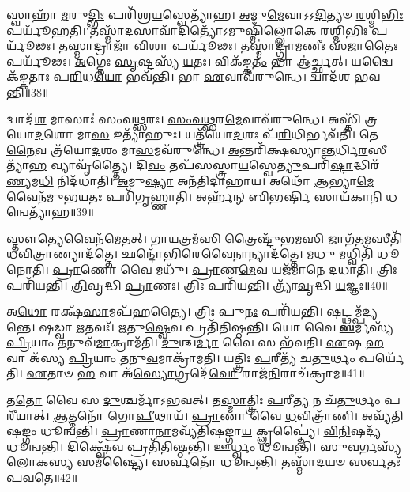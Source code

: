 𑌸𑍍𑌵𑌾𑌹𑌾᳴ \ul{𑌮}\-𑌰𑍁\-\ul{𑌦𑍍𑌭𑌿𑌃} 𑌪𑌰𑌿᳴𑌶𑍍𑌰\-\ul{𑌯}\-𑌸𑍍𑌵𑍇𑌤𑍍𑌯𑌾᳴𑌹। 
\-\ul{𑌅}\-𑌮𑍁\-\ul{𑌮𑍇}\-𑌵𑌾𑌽𑌽\-\ul{𑌦𑌿}\-𑌤𑍍𑌯𑍞 \ul{𑌰}\-𑌶𑍍𑌮𑌿\-\ul{𑌭𑌿𑌃} 𑌪𑌰𑍍𑌯𑍂᳴𑌹𑌤𑌿। 
𑌤𑌸𑍍𑌮𑌾᳴\-\ul{𑌦}\-𑌸𑌾𑌵𑌾᳴\-\ul{𑌦𑌿}\-𑌤𑍍𑌯𑍋᳴𑌽𑌮𑍁𑌷𑍍𑌮𑌿𑌁᳴\-\ul{𑌲𑍍𑌲𑍋}\-𑌕𑍇 \ul{𑌰}\-𑌶𑍍𑌮𑌿\-\ul{𑌭𑌿𑌃} 𑌪𑌰𑍍𑌯𑍂᳴𑌢𑌃। 
𑌤\-\ul{𑌸𑍍𑌮𑌾}\-𑌦𑍍𑌰𑌾𑌜𑌾᳴ \ul{𑌵𑌿}\-𑌶𑌾 𑌪𑌰𑍍𑌯𑍂᳴𑌢𑌃। 
𑌤𑌸𑍍𑌮𑌾॑𑌦𑍍𑌗𑍍𑌰𑌾\-\ul{𑌮}\-𑌣𑍀𑌃 𑌸᳴\-\ul{𑌜𑌾}\-𑌤𑍈𑌃 𑌪𑌰𑍍𑌯𑍂᳴𑌢𑌃। 
\-\ul{𑌅}\-𑌗𑍍𑌨𑍇𑌃 \ul{𑌸𑍃}\-𑌷𑍍𑌟𑌸𑍍𑌯᳴ \ul{𑌯}\-𑌤𑌃। 
𑌵𑌿𑌕᳴𑌙𑍍𑌕\-\ul{𑌤𑌂} 𑌭𑌾 𑌆॑𑌰𑍍𑌚𑍍𑌛𑌤𑍍। 
𑌯𑌦𑍍𑌵𑍈𑌕᳴𑌙𑍍𑌕𑌤𑌾𑌃 𑌪\-\ul{𑌰𑌿}\-𑌧\-\ul{𑌯𑍋} 𑌭𑌵᳴𑌨𑍍𑌤𑌿। 
𑌭𑌾 \ul{𑌏}\-𑌵𑌾𑌵᳴𑌰𑍁𑌨𑍍𑌧𑍇। 
𑌦𑍍𑌵𑌾𑌦᳴𑌶 𑌭𑌵𑌨𑍍𑌤𑌿॥38॥

𑌦𑍍𑌵𑌾𑌦᳴\-\ul{𑌶} 𑌮𑌾𑌸𑌾𑌃॑ 𑌸𑌂𑌵\-\ul{𑌥𑍍𑌸}\-𑌰𑌃। 
\-\ul{𑌸𑌂}\-\-\ul{𑌵}\-\-\ul{𑌥𑍍𑌸}\-𑌰\-\ul{𑌮𑍇}\-𑌵𑌾𑌵᳴𑌰𑍁𑌨𑍍𑌧𑍇। 
𑌅𑌸𑍍𑌤𑌿᳴ 𑌤𑍍𑌰𑌯𑍋\-\ul{𑌦}\-𑌶𑍋 𑌮𑌾\-\ul{𑌸} 𑌇𑌤𑍍𑌯𑌾᳴𑌹𑍁𑌃। 
𑌯𑌤𑍍𑌤𑍍𑌰᳴𑌯𑍋\-\ul{𑌦}\-𑌶𑌃 𑌪᳴\-\ul{𑌰𑌿}\-𑌧𑌿𑌰𑍍𑌭𑌵᳴𑌤𑌿। 
𑌤𑍇\-\ul{𑌨𑍈}\-𑌵 𑌤𑍍𑌰᳴𑌯𑍋\-\ul{𑌦}\-𑌶𑌂 𑌮𑌾\-\ul{𑌸}\-𑌮𑌵᳴𑌰𑍁𑌨𑍍𑌧𑍇। 
\-\ul{𑌅}\-𑌨𑍍𑌤𑌰𑌿᳴𑌕𑍍𑌷𑌸𑍍𑌯𑌾\-\ul{𑌨𑍍𑌤}\-𑌰𑍍𑌧𑌿\-\ul{𑌰}\-𑌸𑍀𑌤𑍍𑌯𑌾᳴\-\ul{𑌹} 𑌵𑍍𑌯𑌾𑌵𑍃᳴𑌤𑍍𑌤𑍍𑌯𑍈। 
𑌦𑌿\-\ul{𑌵𑌂} 𑌤𑌪᳴𑌸𑌸𑍍𑌤𑍍𑌰𑌾\-\ul{𑌯}\-𑌸𑍍𑌵𑍇\-\ul{𑌤𑍍𑌯𑍁}\-𑌪𑌰𑌿᳴\-\ul{𑌷𑍍𑌟𑌾}\-𑌦𑍍𑌧𑌿𑌰᳴\-\ul{𑌣𑍍𑌯}\-𑌮\-\ul{𑌧𑌿} 𑌨𑌿𑌦᳴𑌧𑌾𑌤𑌿। 
\-\ul{𑌅}\-𑌮𑍁\-\ul{𑌷𑍍𑌯𑌾} 𑌅𑌨᳴𑌤𑌿𑌦𑌾𑌹𑌾𑌯। 
𑌅𑌥𑍋᳴ \ul{𑌆}\-𑌭𑍍𑌯𑌾\-\ul{𑌮𑍇}\-𑌵𑍈𑌨᳴𑌮𑍁\-\ul{𑌭}\-𑌯\-\ul{𑌤𑌃} 𑌪𑌰𑌿᳴𑌗𑍃𑌹𑍍𑌣𑌾𑌤𑌿। 
𑌅𑌰𑍍\mbox{}𑌹᳴𑌨𑍍 𑌬𑌿𑌭𑌰𑍍\mbox{}\-\ul{𑌷𑌿} 𑌸𑌾𑌯᳴𑌕𑌾\-\ul{𑌨𑌿} 𑌧𑌨𑍍𑌵𑍇𑌤𑍍𑌯𑌾᳴𑌹॥39॥

𑌸𑍍𑌤𑍗\-\ul{𑌤𑍍𑌯𑍇}\-𑌵𑍈𑌨᳴\-\ul{𑌮𑍇}\-𑌤𑌤𑍍। 
\-\ul{𑌗𑌾}\-\-\ul{𑌯}\-𑌤𑍍𑌰𑌮᳴\-\ul{𑌸𑌿} 𑌤𑍍𑌰𑍈𑌷𑍍𑌟𑍁᳴𑌭𑌮\-\ul{𑌸𑌿} 𑌜𑌾𑌗᳴𑌤\-\ul{𑌮}\-𑌸𑍀𑌤𑌿᳴ \ul{𑌧}\-𑌵𑌿\-\ul{𑌤𑍍𑌰𑌾}\-𑌣𑍍𑌯𑌾𑌦᳴𑌤𑍍𑌤𑍇। 
𑌛𑌨𑍍𑌦𑍋᳴𑌭𑌿\-\ul{𑌰𑍇}\-𑌵𑍈\-\ul{𑌨𑌾}\-𑌨𑍍𑌯𑌾𑌦᳴𑌤𑍍𑌤𑍇। 
𑌮\-\ul{𑌧𑍁} 𑌮𑌧𑍍𑌵𑌿𑌤𑌿᳴ 𑌧𑍂𑌨𑍋𑌤𑌿। 
\-\ul{𑌪𑍍𑌰𑌾}\-𑌣𑍋 𑌵𑍈 𑌮𑌧𑍁᳴। 
\-\ul{𑌪𑍍𑌰𑌾}\-𑌣\-\ul{𑌮𑍇}\-𑌵 𑌯𑌜᳴𑌮𑌾𑌨𑍇 𑌦𑌧𑌾𑌤𑌿। 
𑌤𑍍𑌰𑌿𑌃 𑌪𑌰𑌿᳴𑌯𑌨𑍍𑌤𑌿। 
\-\ul{𑌤𑍍𑌰𑌿}\-𑌵𑍃𑌦𑍍𑌧𑌿 \ul{𑌪𑍍𑌰𑌾}\-𑌣𑌃। 
𑌤𑍍𑌰𑌿𑌃 𑌪𑌰𑌿᳴𑌯𑌨𑍍𑌤𑌿। 
𑌤𑍍𑌰𑍍𑌯𑌾᳴\-\ul{𑌵𑍃}\-𑌦𑍍𑌧𑌿 \ul{𑌯}\-𑌜𑍍𑌞𑌃॥40॥

𑌅\-\ul{𑌥𑍋} 𑌰𑌕𑍍𑌷᳴\-\ul{𑌸𑌾}\-𑌮𑌪᳴𑌹𑌤𑍍𑌯𑍈। 
𑌤𑍍𑌰𑌿𑌃 𑌪𑍁\-\ul{𑌨𑌃} 𑌪𑌰𑌿᳴𑌯𑌨𑍍𑌤𑌿। 
𑌷𑌟𑍍𑌥𑍍𑌸𑌮𑍍𑌪᳴𑌦𑍍𑌯𑌨𑍍𑌤𑍇। 
𑌷𑌡𑍍𑌵𑌾 \ul{𑌋}\-𑌤𑌵𑌃᳴। 
\-\ul{𑌋}\-𑌤𑍁\-\ul{𑌷𑍍𑌵𑍇}\-𑌵 𑌪𑍍𑌰𑌤𑌿᳴𑌤𑌿𑌷𑍍𑌠𑌨𑍍𑌤𑌿। 
𑌯𑍋 𑌵𑍈 \ul{𑌘}\-𑌰𑍍𑌮𑌸𑍍𑌯᳴ \ul{𑌪𑍍𑌰𑌿}\-𑌯𑌾𑌂 \ul{𑌤}\-𑌨𑍁𑌵᳴\-\ul{𑌮𑌾}\-𑌕𑍍𑌰𑌾𑌮᳴𑌤𑌿। 
\-\ul{𑌦𑍁}\-𑌶𑍍𑌚\-\ul{𑌰𑍍𑌮𑌾} 𑌵𑍈 𑌸 𑌭᳴𑌵𑌤𑌿। 
\-\ul{𑌏}\-𑌷 \ul{𑌹} 𑌵𑌾 𑌅᳴𑌸𑍍𑌯 \ul{𑌪𑍍𑌰𑌿}\-𑌯𑌾𑌂 \ul{𑌤}\-𑌨𑍁\-\ul{𑌵}\-𑌮𑌾𑌕𑍍𑌰𑌾᳴𑌮𑌤𑌿। 
𑌯𑌤𑍍𑌤𑍍𑌰𑌿𑌃 \ul{𑌪}\-𑌰𑍀𑌤𑍍𑌯᳴ 𑌚\-\ul{𑌤𑍁}\-𑌰𑍍𑌥𑌂 𑌪𑌰𑍍𑌯𑍇᳴𑌤𑌿। 
\-\ul{𑌏}\-𑌤𑌾𑍞 \ul{𑌹} 𑌵𑌾 𑌅᳴\-\ul{𑌸𑍍𑌯𑍋}\-𑌗𑍍𑌰𑌦𑍇᳴\-\ul{𑌵𑍋} 𑌰𑌾𑌜᳴\-\ul{𑌨𑌿}\-𑌰𑌾𑌚᳴𑌕𑍍𑌰𑌾𑌮॥41॥

𑌤\-\ul{𑌤𑍋} 𑌵𑍈 𑌸 \ul{𑌦𑍁}\-𑌶𑍍𑌚𑌰𑍍𑌮𑌾᳴𑌽𑌭𑌵𑌤𑍍। 
𑌤\-\ul{𑌸𑍍𑌮𑌾}\-𑌤𑍍𑌤𑍍𑌰𑌿𑌃 \ul{𑌪}\-𑌰𑍀\-\ul{𑌤𑍍𑌯} 𑌨 𑌚᳴\-\ul{𑌤𑍁}\-𑌰𑍍𑌥𑌂 𑌪𑌰𑍀᳴𑌯𑌾𑌤𑍍। 
\-\ul{𑌆}\-𑌤𑍍𑌮𑌨𑍋᳴ 𑌗𑍋\-\ul{𑌪𑍀}\-𑌥𑌾𑌯᳴। 
\-\ul{𑌪𑍍𑌰𑌾}\-𑌣𑌾 𑌵𑍈 \ul{𑌧}\-𑌵𑌿𑌤𑍍𑌰𑌾᳴𑌣𑌿। 
𑌅𑌵𑍍𑌯᳴𑌤𑌿𑌷𑌙𑍍𑌗𑌂 𑌧𑍂𑌨𑍍𑌵𑌨𑍍𑌤𑌿। 
\-\ul{𑌪𑍍𑌰𑌾}\-𑌣𑌾\-\ul{𑌨𑌾}\-𑌮𑌵𑍍𑌯᳴𑌤𑌿𑌷𑌙𑍍𑌗𑌾\-\ul{𑌯} 𑌕𑍍𑌲𑍃𑌪𑍍𑌤𑍍𑌯𑍈॑। 
\-\ul{𑌵𑌿}\-\-\ul{𑌨𑌿}\-𑌷𑌦𑍍𑌯᳴ 𑌧𑍂𑌨𑍍𑌵𑌨𑍍𑌤𑌿। 
\-\ul{𑌦𑌿}\-𑌕𑍍𑌷𑍍𑌵𑍇᳴𑌵 𑌪𑍍𑌰𑌤𑌿᳴𑌤𑌿𑌷𑍍𑌠𑌨𑍍𑌤𑌿। 
\-\ul{𑌊}\-𑌰𑍍𑌧𑍍𑌵𑌂 𑌧𑍂॑𑌨𑍍𑌵𑌨𑍍𑌤𑌿। 
\-\ul{𑌸𑍁}\-\-\ul{𑌵}\-𑌰𑍍𑌗𑌸𑍍𑌯᳴ \ul{𑌲𑍋}\-𑌕\-\ul{𑌸𑍍𑌯} 𑌸𑌮᳴𑌷𑍍𑌟𑍍𑌯𑍈। 
\-\ul{𑌸}\-𑌰𑍍𑌵𑌤𑍋᳴ 𑌧𑍂𑌨𑍍𑌵𑌨𑍍𑌤𑌿। 
𑌤𑌸𑍍𑌮𑌾᳴\-\ul{𑌦}\-𑌯𑍞 \ul{𑌸}\-𑌰𑍍𑌵𑌤𑌃᳴ 𑌪𑌵𑌤𑍇॥42॥
\anuvakamend[\-\ul{𑌦}\-\-\ul{𑌧𑌾}\-\-\ul{𑌤𑍀}\-𑌵𑌾𑌨𑍍𑌵𑌾᳴𑌹 \ul{𑌯}\-𑌜𑍍𑌞𑌸𑍍𑌯𑌾᳴\-\ul{𑌹𑍈}\-𑌷 \ul{𑌉}\-𑌪𑌰𑌿᳴𑌷𑍍𑌟𑌾𑌦𑌾𑌶𑍀\-\ul{𑌰}\-𑌨𑍍𑌯𑍋 𑌵𑍍𑌯𑌾॑\-\ul{𑌸𑍍𑌥𑌾}\-𑌪𑌯᳴𑌨𑍍𑌤𑌿 \ul{𑌰}\-𑌶𑍍𑌮𑌯𑍋᳴ 𑌭𑌵\-\ul{𑌨𑍍𑌤𑌿} 𑌧𑌨𑍍𑌵𑍇𑌤𑍍𑌯𑌾᳴𑌹 \ul{𑌯}\-𑌜𑍍𑌞𑌶𑍍𑌚᳴𑌕𑍍𑌰𑌾\-\ul{𑌮} 𑌸𑌮᳴\-\ul{𑌷𑍍𑌟𑍍𑌯𑍈} 𑌦𑍍𑌵𑍇 𑌚᳴]

